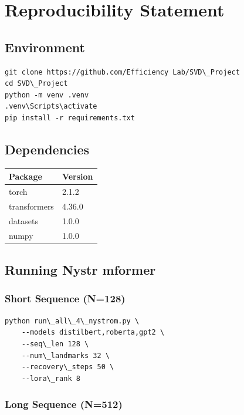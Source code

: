 
\section{Reproducibility Statement}

\subsection{Environment}

\begin{lstlisting}
git clone https://github.com/Efficiency Lab/SVD\_Project
cd SVD\_Project
python -m venv .venv
.venv\Scripts\activate
pip install -r requirements.txt
\end{lstlisting}

\subsection{Dependencies}

\begin{table}[H]
\centering
\small
\begin{tabular}{ll}
\toprule
\textbf{Package} & \textbf{Version} \\
\midrule
torch & 2.1.2 \\
transformers & 4.36.0 \\
datasets & 1.0.0 \\
numpy & 1.0.0 \\
\bottomrule
\end{tabular}
\end{table}

\subsection{Running Nystr mformer}

\subsubsection{Short Sequence (N=128)}

\begin{lstlisting}
python run\_all\_4\_nystrom.py \
    --models distilbert,roberta,gpt2 \
    --seq\_len 128 \
    --num\_landmarks 32 \
    --recovery\_steps 50 \
    --lora\_rank 8
\end{lstlisting}

\subsubsection{Long Sequence (N=512)}

